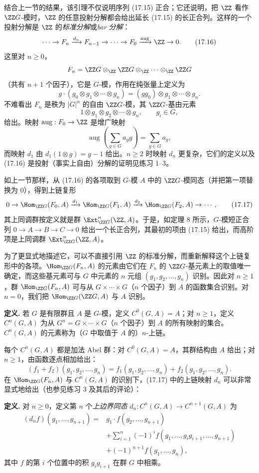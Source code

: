 结合上一节的结果，该引理不仅说明序列 (17.15) 正合；它还说明，把 $\ZZ$ 看作 $\ZZ G$-模时，$\ZZ$ 的任意投射分解都会给出延长 (17.15) 的长正合列。这样的一个投射分解是 $\ZZ$ 的\emph{标准分解}或\emph{bar 分解}：
\[
  \cdots\to F_n\xrightarrow{d_n}F_{n-1}\to\cdots\to F_0\xrightarrow{\operatorname{aug}}\ZZ\to0.
  \tag{17.16}
\]
这里对 $n\geq0$，
\[
  F_n=\ZZ G\otimes_{\ZZ}\ZZ G\otimes_{\ZZ}\cdots\otimes_{\ZZ}\ZZ G
\]
（共有 $n+1$ 个因子），它是 $G$-模，作用在纯张量上定义为
\[
  g\cdot(g_0\otimes g_1\otimes\cdots\otimes g_n)
  =(gg_0)\otimes g_1\otimes\cdots\otimes g_n.
\]
不难看出 $F_n$ 是秩为 $|G|^n$ 的自由 $\ZZ G$-模，其 $\ZZ G$-基由元素
\[
  1\otimes g_1\otimes g_2\otimes\cdots\otimes g_n,
  \qquad g_i\in G,
\]
给出。映射 $\operatorname{aug}:F_0\to\ZZ$ 是增广映射
\[
  \operatorname{aug}\left(\sum_{g\in G}a_gg\right)=\sum_{g\in G}a_g,
\]
而映射 $d_1$ 由 $d_1(1\otimes g)=g-1$ 给出。$n\geq2$ 时映射 $d_n$ 更复杂，它们的定义以及 (17.16) 是投射（事实上自由）分解的证明见练习 1--3。

如上一节那样，从 (17.16) 的各项取到 $G$-模 $A$ 中的 $\ZZ G$-模同态（并把第一项替换为 $0$），得到上链复形
\[
  0\to\Hom_{\ZZ G}(F_0,A)\xrightarrow{d_1}\Hom_{\ZZ G}(F_1,A)\xrightarrow{d_2}\Hom_{\ZZ G}(F_2,A)\to\cdots,
  \tag{17.17}
\]
其上同调群按定义就是群 $\Ext_{\ZZ G}^n(\ZZ,A)$。于是，如定理 8 所示，$G$-模短正合列 $0\to A\to B\to C\to0$ 给出一个长正合列，其最初的项由 (17.15) 给出，而高阶项是上同调群 $\Ext_{\ZZ G}^n(\ZZ,A)$。

为了更显式地描述它，可以不直接引用 $\ZZ$ 的标准分解，而重新解释这个上链复形中的各项。$\Hom_{\ZZ G}(F_n,A)$ 的元素由它们在 $F_n$ 的 $\ZZ G$-基元素上的取值唯一确定，而这些基元素可与 $G$ 中元素的 $n$ 元组 $(g_1,g_2,
\ldots,g_n)$ 识别。因此对 $n\geq1$，群 $\Hom_{\ZZ G}(F_n,A)$ 可与从 $G\times\cdots\times G$（$n$ 个因子）到 $A$ 的函数集合识别。对 $n=0$，我们把 $\Hom_{\ZZ G}(\ZZ G,A)$ 与 $A$ 识别。

\noindent\textbf{定义.} 若 $G$ 是有限群且 $A$ 是 $G$-模，定义 $C^0(G,A)=A$；对 $n\geq1$，定义 $C^n(G,A)$ 为从 $G^n=G\times\cdots\times G$（$n$ 个因子）到 $A$ 的所有映射的集合。$C^n(G,A)$ 的元素称为（$G$ 中取值于 $A$ 的）$n$-上链。

每个 $C^n(G,A)$ 都是加法 Abel 群：对 $C^0(G,A)=A$，其群结构由 $A$ 给出；对 $n\geq1$，由函数逐点相加给出：
\[
  (f_1+f_2)(g_1,g_2,
  \ldots,g_n)=f_1(g_1,g_2,
  \ldots,g_n)+f_2(g_1,g_2,
  \ldots,g_n).
\]
在 $\Hom_{\ZZ G}(F_n,A)$ 与 $C^n(G,A)$ 的识别下，(17.17) 中的上链映射 $d_n$ 可以非常显式地给出（也参见练习 3 及其后的评论）：

\noindent\textbf{定义.} 对 $n\geq0$，定义第 $n$ 个\emph{上边界同态} $d_n:C^n(G,A)\to C^{n+1}(G,A)$ 为
\[
\begin{aligned}
(d_nf)(g_1,
\ldots,g_{n+1})={}&g_1\cdot f(g_2,
\ldots,g_{n+1})\\
&+\sum_{i=1}^{n}(-1)^i f(g_1,
\ldots,g_ig_{i+1},
\ldots,g_{n+1})\\
&+(-1)^{n+1}f(g_1,
\ldots,g_n),
\end{aligned}
\tag{17.18}
\]
其中 $f$ 的第 $i$ 个位置中的积 $g_ig_{i+1}$ 在群 $G$ 中相乘。

